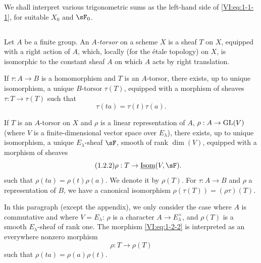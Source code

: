 We shall interpret various trigonometric sums as the left-hand side of 
\eqref{VI:eq:1-1-1}, for suitable $X_0$ and $\sF_0$. 





\subsection{}\label{VI:1-2}

Let $A$ be a finite group. An \emph{$A$-torsor} on a scheme $X$ is a 
sheaf $T$ on $X$, equipped with a right action of $A$, which, locally 
(for the étale topology) on $X$, is isomorphic to the constant sheaf $A$ on 
which $A$ acts by right translation. 

If $\tau:A\to B$ is a homomorphism and $T$ is an $A$-torsor, there exists, 
up to unique isomorphism, a unique $B$-torsor $\tau(T)$, equipped with a 
morphism of sheaves $\tau:T\to \tau(T)$ such that 
\begin{equation*}\tag{1.2.1}\label{VI:eq:1-2-1}
  \tau(t a) = \tau(t) \tau(a)\text{.}
\end{equation*}

If $T$ is an $A$-torsor on $X$ and $\rho$ is a linear representation 
of $A$, $\rho:A\to \operatorname{GL}(V)$ (where $V$ is a finite-dimensional vector space over 
$E_\lambda$), there exists, up to unique isomorphism, a unique 
$E_\lambda$-sheaf $\sF$, smooth of rank $\dim(V)$, equipped with a morphism of 
sheaves 
\begin{equation*}\tag{1.2.2}\label{VI:eq:1-2-2}
  \rho:T\to \underline{\operatorname{Isom}}(V,\sF) \text{.}
\end{equation*}
such that $\rho(t a) = \rho(t) \rho(a)$. We denote it by $\rho(T)$. For 
$\tau:A\to B$ and $\rho$ a representation of $B$, we have a canonical 
isomorphism $\rho(\tau(T)) = (\rho\tau)(T)$. 

In this paragraph (except the appendix), we only consider the case where $A$ 
is commutative and where $V=E_\lambda$: $\rho$ is a character 
$A\to E_\lambda^\times$, and $\rho(T)$ is a smooth $E_\lambda$-sheaf of rank 
one. The morphism \eqref{VI:eq:1-2-2} is interpreted as an everywhere 
nonzero morphism 
\begin{equation*}\tag{1.2.3}\label{VI:eq:1-2-3}
  \rho:T\to \rho(T) 
\end{equation*}
such that $\rho(t a) = \rho(a)\rho(t)$. 





\subsection{}\label{VI:1-3}

